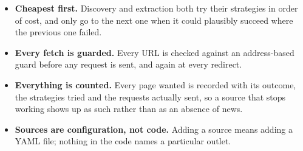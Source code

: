 \begin{itemize}
    \item \textbf{Cheapest first.} Discovery and extraction both try
    their strategies in order of cost, and only go to the next one when
    it could plausibly succeed where the previous one failed.
    \item \textbf{Every fetch is guarded.} Every URL is checked against
    an address-based guard before any request is sent, and again at
    every redirect.
    \item \textbf{Everything is counted.} Every page wanted is recorded
    with its outcome, the strategies tried and the requests actually
    sent, so a source that stops working shows up as such rather than
    as an absence of news.
    \item \textbf{Sources are configuration, not code.} Adding a source
    means adding a YAML file; nothing in the code names a particular
    outlet.
\end{itemize}

